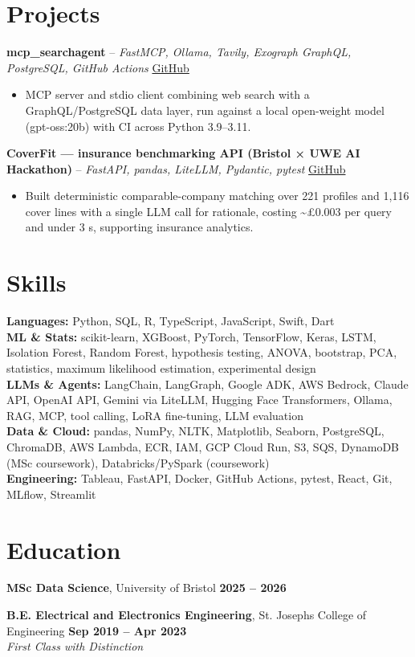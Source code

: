 \documentclass[a4paper,10pt]{article}
\begin{document}
\section{Projects}
\noindent\textbf{mcp\_searchagent} -- \textit{FastMCP, Ollama, Tavily, Exograph GraphQL, PostgreSQL, GitHub Actions} \hfill \href{https://github.com/Thiruvel-AP/mcp_searchagent}{GitHub}
\begin{itemize}
  \item MCP server and stdio client combining web search with a GraphQL/PostgreSQL data layer, run against a local open-weight model (gpt-oss:20b) with CI across Python 3.9–3.11.
\end{itemize}
\noindent\textbf{CoverFit — insurance benchmarking API (Bristol × UWE AI Hackathon)} -- \textit{FastAPI, pandas, LiteLLM, Pydantic, pytest} \hfill \href{https://github.com/Thiruvel-AP/AIHackathon-Phoenix}{GitHub}
\begin{itemize}
  \item Built deterministic comparable-company matching over 221 profiles and 1,116 cover lines with a single LLM call for rationale, costing \textasciitilde{}£0.003 per query and under 3 s, supporting insurance analytics.
\end{itemize}

\section{Skills}
\textbf{Languages:} Python, SQL, R, TypeScript, JavaScript, Swift, Dart\\
\textbf{ML \& Stats:} scikit-learn, XGBoost, PyTorch, TensorFlow, Keras, LSTM, Isolation Forest, Random Forest, hypothesis testing, ANOVA, bootstrap, PCA, statistics, maximum likelihood estimation, experimental design\\
\textbf{LLMs \& Agents:} LangChain, LangGraph, Google ADK, AWS Bedrock, Claude API, OpenAI API, Gemini via LiteLLM, Hugging Face Transformers, Ollama, RAG, MCP, tool calling, LoRA fine-tuning, LLM evaluation\\
\textbf{Data \& Cloud:} pandas, NumPy, NLTK, Matplotlib, Seaborn, PostgreSQL, ChromaDB, AWS Lambda, ECR, IAM, GCP Cloud Run, S3, SQS, DynamoDB (MSc coursework), Databricks/PySpark (coursework)\\
\textbf{Engineering:} Tableau, FastAPI, Docker, GitHub Actions, pytest, React, Git, MLflow, Streamlit

\section{Education}
\textbf{MSc Data Science}, University of Bristol \hfill \textbf{2025 – 2026}\par
\vspace{2pt}
\textbf{B.E. Electrical and Electronics Engineering}, St. Joseph\textquotesingle{}s College of Engineering \hfill \textbf{Sep 2019 – Apr 2023}\\ \textit{First Class with Distinction}\par
\end{document}
